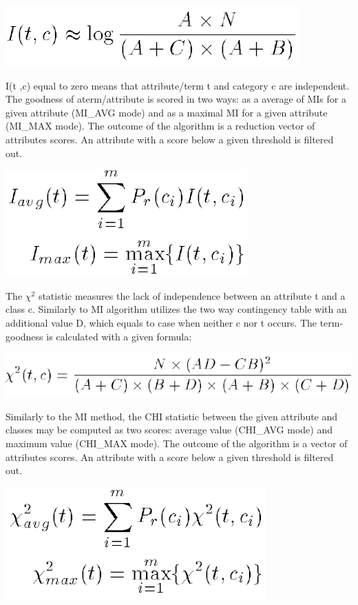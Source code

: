 \documentclass[12pt,a4paper]{report}
\begin{document}
\includegraphics[scale=0.8]{MI1}

I(t ,c) equal to zero means that attribute/term t and category c are independent. The goodness of aterm/attribute is scored in two ways: as a average of MIs for a given attribute (MI\_AVG mode) and as a maximal MI for a given attribute (MI\_MAX mode). The outcome of the algorithm is a reduction vector of attributes scores. An attribute with a score below a given threshold is filtered out.

\includegraphics[scale=0.8]{MI_scores}



The \({\chi}^2\) statistic measures the lack of independence between an attribute t and a class c. Similarly to MI algorithm utilizes the two way contingency table with an additional value D, which equals to case when neither c nor t occurs. The term-goodness is calculated with a given formula:

\includegraphics[scale=0.8]{CHI1}

Similarly to the MI method, the CHI statistic between the given attribute and classes may be computed as two scores: average value (CHI\_AVG mode) and maximum value (CHI\_MAX mode). The outcome of the algorithm is a vector of attributes scores. An attribute with a score below a given threshold is filtered out.

\includegraphics[scale=0.8]{CHI_scores}
\end{document}
